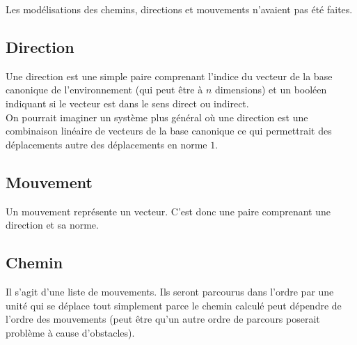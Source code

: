 Les modélisations des chemins, directions et mouvements n'avaient pas été faites.

\subsection{Direction}

Une direction est une simple paire comprenant l'indice du vecteur de la base canonique de l'environnement (qui peut être à $n$ dimensions) et un booléen indiquant si le vecteur est dans le sens direct ou indirect.\\
On pourrait imaginer un système plus général où une direction est une combinaison linéaire de vecteurs de la base canonique ce qui permettrait des déplacements autre des déplacements en norme $1$.

\subsection{Mouvement}
Un mouvement représente un vecteur. C'est donc une paire comprenant une direction et sa norme.

\subsection{Chemin}

Il s'agit d'une liste de mouvements. Ils seront parcourus dans l'ordre par une unité qui se déplace tout simplement parce le chemin calculé peut dépendre de l'ordre des mouvements (peut être qu'un autre ordre de parcours poserait problème à cause d'obstacles).


